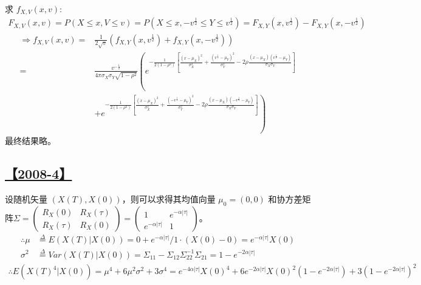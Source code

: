 求 $f_{X, V}(x, v)$:
\begin{equation}\tag*{}
\begin{split}
F_{X,V}(x,v)=P(X\le x, V\le v)=P(X\le x, -v^{\frac{1}{2}}\le Y\le v^{\frac{1}{2}})=F_{X, Y}(x, v^\frac{1}{2})-F_{X, Y}(x, -v^\frac{1}{2})
\end{split}
\end{equation}
\begin{equation}\tag*{}
\begin{split}
\Rightarrow f_{X, V}(x, v)=&\frac{1}{2\sqrt{v}}(f_{X, Y}(x,v^\frac{1}{2})+f_{X, Y}(x, -v^\frac{1}{2}))\\
=&\frac{v^{-\frac{1}{2}}}{4\pi\sigma_X\sigma_Y\sqrt{1-\rho^2}}\left(e^{-\frac{1}{2(1-\rho^2)}\left[\frac{(x-\mu_X)^2}{\sigma_X^2}+\frac{(v^{\frac{1}{2}}-\mu_Y)^2}{\sigma_Y^2}-2\rho\frac{(x-\mu_X)(v^{\frac{1}{2}}-\mu_Y)}{\sigma_X\sigma_Y}\right]}\right.\\
&+\left.e^{-\frac{1}{2(1-\rho^2)}\left[\frac{(x-\mu_X)^2}{\sigma_X^2}+\frac{(-v^{\frac{1}{2}}-\mu_Y)^2}{\sigma_Y^2}-2\rho\frac{(x-\mu_X)(-v^{\frac{1}{2}}-\mu_Y)}{\sigma_X\sigma_Y}\right]}\right)
\end{split}
\end{equation}
最终结果略。

\subsection{\hyperref[Q2008-4]{【2008-4】}}\label{A2008-4}

设随机矢量 $(X(T), X(0))$，则可以求得其均值向量 $\mu_0=(0, 0)$ 和协方差矩阵$\Sigma=\left(\begin{matrix}R_X(0)&R_X(\tau)\\R_X(\tau)&R_X(0)\end{matrix}\right)=\left(\begin{matrix}1&e^{-\alpha|\tau|}\\e^{-\alpha|\tau|}&1\end{matrix}\right)$。
\begin{equation}\tag*{}
\begin{split}
\therefore \mu&\overset{\Delta}{=}E(X(T)|X(0))=0+e^{-\alpha|\tau|}/1\cdot(X(0)-0)=e^{-\alpha|\tau|}X(0)\\
\sigma^2&\overset{\Delta}{=}Var(X(T)|X(0))=\Sigma_{11}-\Sigma_{12}\Sigma_{22}^{-1}\Sigma_{21}=1-e^{-2\alpha|\tau|}
\end{split}
\end{equation}
\begin{equation}\tag*{}
\begin{split}
\therefore E(X(T)^4|X(0))=\mu^4+6\mu^2\sigma^2+3\sigma^4=e^{-4\alpha|\tau|}X(0)^4+6e^{-2\alpha|\tau|}X(0)^2(1-e^{-2\alpha|\tau|})+3(1-e^{-2\alpha|\tau|})^2
\end{split}
\end{equation}

